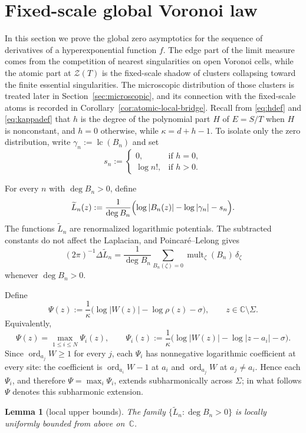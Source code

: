\documentclass[reqno]{article}
\newtheorem{lem}[theorem]{Lemma}
\theoremstyle{definition}
\theoremstyle{remark}
\theoremstyle{plain}
\newcommand{\C}{\mathbb C}
\newcommand{\Z}{\mathcal Z}
\newcommand{\ord}{\operatorname{ord}}
\newcommand{\lc}{\operatorname{lc}}
\begin{document}
\section{Fixed-scale global Voronoi law}\label{sec:global}

In this section we prove the global zero asymptotics for the sequence of derivatives of a hyperexponential function $f$. The edge part of the limit measure comes from the competition of nearest singularities on open Voronoi cells, while the atomic part at $\Z(T)$ is the fixed-scale shadow of clusters collapsing toward the finite essential singularities. The microscopic distribution of those clusters is treated later in Section~\ref{sec:microscopic}, and its connection with the fixed-scale atoms is recorded in Corollary~\ref{cor:atomic-local-bridge}. Recall from \eqref{eq:hdef} and \eqref{eq:kappadef} that $h$ is the degree of the polynomial part $H$ of $E=S/T$ when $H$ is nonconstant, and $h=0$ otherwise, while $\kappa=d+h-1$. To isolate only the zero distribution, write $\gamma_n:=\lc(B_n)$ and set
\begin{equation}\label{eq:sndef}
s_n:=
\begin{cases}
0, & \text{if } h=0,\\
\log n!, & \text{if } h>0.
\end{cases}
\end{equation}

For every $n$ with $\deg B_n>0$, define
\begin{equation}\label{eq:Ltildedef}
\widetilde L_n(z):=\frac{1}{\deg B_n}\Bigl(\log|B_n(z)|-\log|\gamma_n|-s_n\Bigr).
\end{equation}
The functions $\widetilde L_n$ are renormalized logarithmic potentials. The subtracted constants do not affect the Laplacian, and Poincar\'e--Lelong gives
\[
(2\pi)^{-1}\Delta\widetilde L_n
=\frac{1}{\deg B_n}\sum_{B_n(\zeta)=0}\operatorname{mult}_\zeta(B_n)\,\delta_\zeta
\]
whenever $\deg B_n>0$.

Define
\begin{equation}\label{eq:Psidef}
\Psi(z):=\frac{1}{\kappa}\bigl(\log|W(z)|-\log\rho(z)-\sigma\bigr),\qquad z\in\C\setminus\Sigma.
\end{equation}
Equivalently,
$$\Psi(z)=\max_{1\le i\le N}\Psi_i(z),\qquad
\Psi_i(z):=\frac{1}{\kappa}\bigl(\log|W(z)|-\log|z-a_i|-\sigma\bigr).$$
Since $\ord_{a_j}W\ge1$ for every $j$, each $\Psi_i$ has nonnegative logarithmic coefficient at every site: the coefficient is $\ord_{a_i}W-1$ at $a_i$ and $\ord_{a_j}W$ at $a_j\ne a_i$. Hence each $\Psi_i$, and therefore $\Psi=\max_i\Psi_i$, extends subharmonically across $\Sigma$; in what follows $\Psi$ denotes this subharmonic extension.
\begin{lem}[local upper bounds]\label{lem:locub}
The family $\{\widetilde L_n:\deg B_n>0\}$ is locally uniformly bounded from above on~$\C$.
\end{lem}
\end{document}
